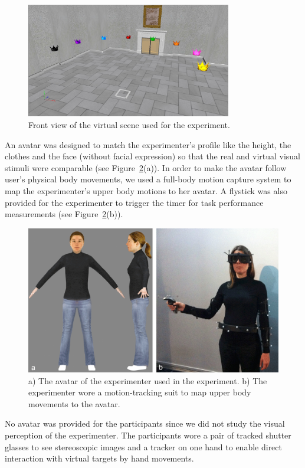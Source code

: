 \begin{figure}[tb]
  \centering
  \includegraphics[width=0.8\textwidth]{figures/ch3/virtual_room}
  \caption{\label{fig:3_virtual_room}Front view of the virtual scene used for the experiment.}
\end{figure}

An avatar was designed to match the experimenter's profile like the height, the clothes and the face (without facial expression) so that the real and virtual visual stimuli were comparable (see Figure~\ref{fig:3_avatar}(a)). In order to make the avatar follow user's physical body movements, we used a full-body motion capture system to map the experimenter's upper body motions to her avatar. A flystick was also provided for the experimenter to trigger the timer for task performance measurements (see Figure~\ref{fig:3_avatar}(b)).

\begin{figure}[htb]
  \centering
  \includegraphics[width=.9\textwidth]{figures/ch3/avatar_photo}
  \caption{\label{fig:3_avatar}a) The avatar of the experimenter used in the experiment. b) The experimenter wore a motion-tracking suit to map upper body movements to the avatar.}
\end{figure}

No avatar was provided for the participants since we did not study the visual perception of the experimenter. The participants wore a pair of tracked shutter glasses to see stereoscopic images and a tracker on one hand to enable direct interaction with virtual targets by hand movements.


